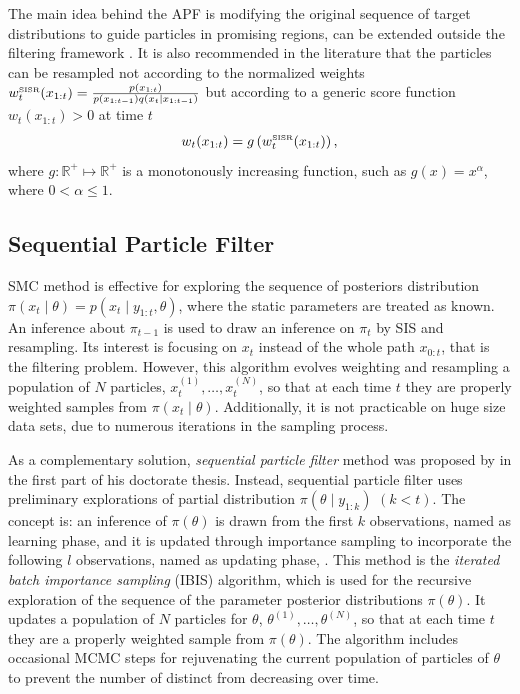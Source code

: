 The main idea behind the APF is modifying the original sequence of target distributions to guide particles in promising regions, can be extended outside the filtering framework \citep{JOHANSEN20081498}. It is also recommended in the literature \citep{liu2008monte} that the particles can be resampled not according to the normalized weights $w_t^{\mbox{\tiny SISR}}(x_{1:t})=\frac{p(x_{1:t})}{ p(x_{1:t-1})q(x_t\mid x_{1:t-1})  }$  but according to a generic score function $w_t(x_{1:t})>0$ at time $t$
\begin{equation}
w_t(x_{1:t}) = g\left(w_t^{\mbox{\tiny SISR}}(x_{1:t})\right),
\end{equation}
where $g: \mathbb{R}^+\mapsto \mathbb{R}^+$ is a monotonously increasing function, such as $g(x)=x^\alpha$, where $0<\alpha\leq 1$. 



\subsection{Sequential Particle Filter}


SMC method is effective for exploring the sequence of posteriors distribution  $\pi(x_t\mid\theta) = p(x_t\mid y_{1:t},\theta)$, where the static parameters are treated as known. An inference about $\pi_{t-1}$ is used to draw an inference on $\pi_t$ by SIS and resampling. Its interest is focusing on $x_t$ instead of the whole path $x_{0:t}$, that is the filtering problem. However, this algorithm evolves weighting and resampling a population of $N$ particles, $x_t^{(1)},\ldots,x_t^{(N)}$, so that at each time $t$ they are properly weighted samples from $\pi(x_t \mid \theta)$. Additionally, it is not practicable on huge size data sets, due to numerous iterations in the sampling process. 

As a complementary solution, \textit{sequential particle filter} method was proposed by \cite{chopin2002sequential} in the first part of his doctorate thesis. Instead, sequential particle filter uses preliminary explorations of partial distribution $\pi(\theta\mid y_{1:k})$ $(k<t)$. The concept is: an inference of $\pi(\theta)$ is drawn from the first $k$ observations, named as learning phase, and it is updated through importance sampling to incorporate the following $l$ observations, named as updating phase, \citep{chopin2002sequential}.  This method is the \textit{iterated batch importance sampling} (IBIS) algorithm, which is used for the recursive exploration of the sequence of the parameter posterior distributions $\pi(\theta)$. It updates a population of $N$ particles for $\theta$, $\theta^{(1)}, \ldots, \theta^{(N)}$, so that at each time $t$ they are a properly weighted sample from $\pi(\theta)$. The algorithm includes occasional MCMC steps for rejuvenating the current population of particles of $\theta$  to prevent the number of distinct from decreasing over time. 

